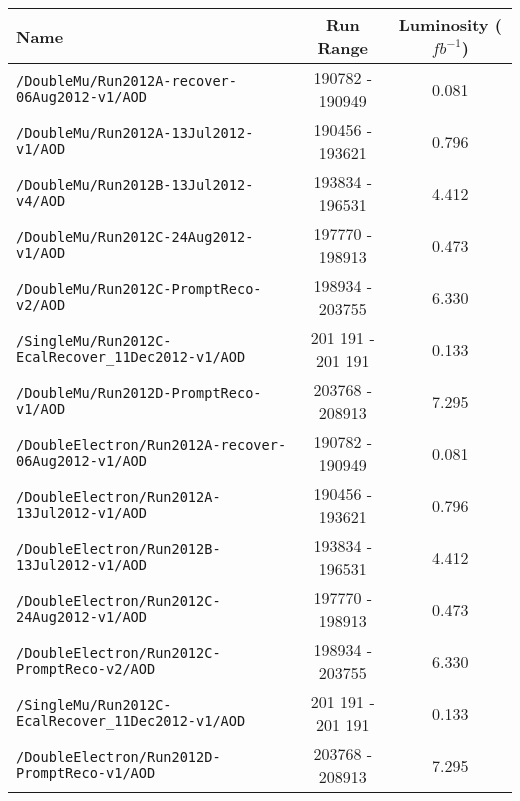 \begin{table}[hbt]
\begin{center}
\begin{tabular}{lcc}\hline\hline
Name		& Run Range & Luminosity ($fb^{-1}$) \\ \hline
\verb=/DoubleMu/Run2012A-recover-06Aug2012-v1/AOD=                 & 190782 - 190949 &  0.081 \\ 
\verb=/DoubleMu/Run2012A-13Jul2012-v1/AOD=                                  &  190456 - 193621       & 0.796               \\ 
\verb=/DoubleMu/Run2012B-13Jul2012-v4/AOD=                                  &  193834 - 196531        & 4.412             \\ 
\verb=/DoubleMu/Run2012C-24Aug2012-v1/AOD=                                &  197770 - 198913  & 0.473\\  
\verb=/DoubleMu/Run2012C-PromptReco-v2/AOD=                               &  198934 - 203755     & 6.330                \\ 
\verb=/SingleMu/Run2012C-EcalRecover_11Dec2012-v1/AOD=          & 201 191 - 201 191 & 0.133\\
\verb=/DoubleMu/Run2012D-PromptReco-v1/AOD=                               &  203768 - 208913  &  7.295 \\

\verb=/DoubleElectron/Run2012A-recover-06Aug2012-v1/AOD=         &    190782 - 190949     & 0.081              \\ 
\verb=/DoubleElectron/Run2012A-13Jul2012-v1/AOD=                         & 190456 - 193621   & 0.796                    \\ 
\verb=/DoubleElectron/Run2012B-13Jul2012-v1/AOD=                         &  193834 - 196531  & 4.412\\ 
\verb=/DoubleElectron/Run2012C-24Aug2012-v1/AOD=                       &  197770 - 198913    & 0.473                 \\ 
\verb=/DoubleElectron/Run2012C-PromptReco-v2/AOD=                     &   198934 - 203755     & 6.330             \\ 
\verb=/SingleMu/Run2012C-EcalRecover_11Dec2012-v1/AOD=          & 201 191 - 201 191 & 0.133\\
\verb=/DoubleElectron/Run2012D-PromptReco-v1/AOD=                      &  203768 - 208913  &  7.295 \\


\end{tabular}
\end{center}
\end{table}
